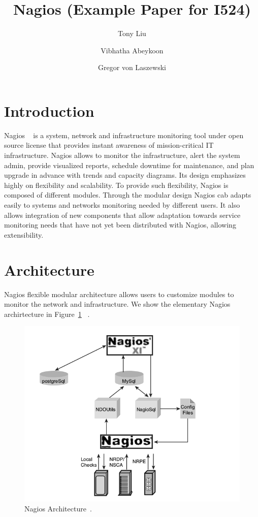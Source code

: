 \documentclass[9pt,twocolumn,twoside]{../../styles/osajnl}
\title{\centering%
Nagios (Example Paper for I524)}
\author[1]{Tony Liu}
\author[1]{Vibhatha Abeykoon}
\author[1]{Gregor von Laszewski}
\affil[1]{School of Informatics and Computing, Bloomington, IN 47408, U.S.A.}
\begin{document}
\maketitle

\section{Introduction}

Nagios ~\cite{www-nagios, wiki-nagios} is a system, network and
infrastructure monitoring tool under open source license that provides
instant awareness of mission-critical IT infrastructure. Nagios allows
to monitor the infrastructure, alert the system admin, provide
visualized reports, schedule downtime for maintenance, and plan
upgrade in advance with trends and capacity diagrams. Its design
emphasizes highly on flexibility and scalability. To provide such
flexibility, Nagios is composed of different modules. Through the
modular design Nagios cab adapts easily to systems and networks
monitoring needed by different users. It also allows integration of new
components that allow adaptation towards service monitoring needs that
have not yet been distributed with Nagios, allowing extensibility.

\section{Architecture}

Nagios \cite{nagios-paper-2012} flexible modular architecture allows
users to customize modules to monitor the network and
infrastructure. We show the elementary Nagios archirtecture in
Figure~\ref{fig:Nagios-architecture} ~\cite{nagios-book}.

\begin{figure}[htb]
\centering
\includegraphics[width=\columnwidth]{images/nagios-architecture}
\caption{Nagios Architecture~\cite{nagios-book}.}
\label{fig:Nagios-architecture}
\end{figure}
\end{document}
